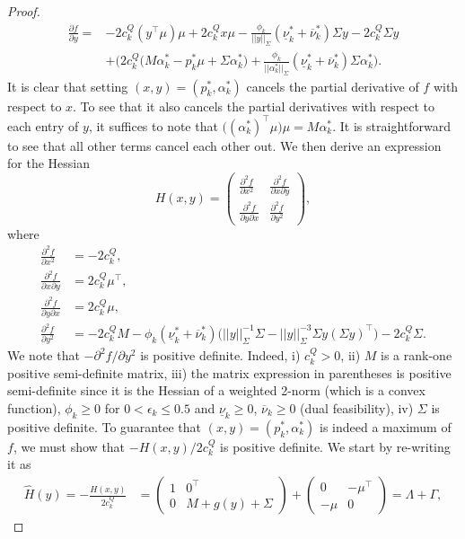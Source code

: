 \documentclass{article}
\begin{document}
\begin{proof}
\begin{align*}
\frac{\partial f}{\partial y} =& - 2c_k^Q (y^\top \mu) \mu + 2 c_k^Q x \mu - \frac{\phi_k}{||y||_\Sigma} (\underline{\nu}_k^* + \overline{\nu}_k^*) \Sigma y - 2c_k^Q \Sigma y\\
&+ \Big(2c_k^Q\big(M \alpha_k^* - p_k^* \mu + \Sigma \alpha_k^*\big) + \frac{\phi_k}{||\alpha_k^*||_\Sigma}(\underline{\nu}_k^* +\overline{\nu}_k^*) \Sigma \alpha_k^*\Big).
\end{align*}
It is clear that setting $(x, y) = (p_k^*, \alpha_k^*)$ cancels the partial derivative of $f$ with respect to $x$. To see that it also cancels the partial derivatives with respect to each entry of $y$, it suffices to note that $\big((\alpha_k^*)^\top \mu\big)\mu = M\alpha_k^*$. It is straightforward to see that all other terms cancel each other out. We then derive an expression for the Hessian
\begin{equation*}
H(x, y) = \begin{pmatrix} \frac{\partial^2 f}{\partial x^2} & \frac{\partial^2 f}{\partial x \partial y} \\ \frac{\partial^2 f}{\partial y \partial x} & \frac{\partial^2 f}{\partial y^2}\end{pmatrix},
\end{equation*}
where
\begin{align*}
\frac{\partial^2 f}{\partial x^2} &= - 2c_k^Q,\\
\frac{\partial^2 f}{\partial x \partial y} &= 2 c_k^Q \mu^\top,\\
\frac{\partial^2 f}{\partial y \partial x} &= 2 c_k^Q \mu,\\
\frac{\partial^2 f}{\partial y^2} &= -2 c_k^Q M - \phi_k(\underline{\nu}_k^* + \overline{\nu}_k^*)\Big(||y||_\Sigma^{-1} \Sigma - ||y||_\Sigma^{-3} \Sigma y(\Sigma y)^\top\Big) - 2c_k^Q \Sigma.
\end{align*}
We note that $-\partial^2 f/\partial y^2$ is positive definite. Indeed, i) $c_k^Q > 0$, ii) $M$ is a rank-one positive semi-definite matrix, iii) the matrix expression in parentheses is positive semi-definite since it is the Hessian of a weighted 2-norm (which is a convex function), $\phi_k \ge 0$ for $0 < \epsilon_k \le 0.5$ and $\underline{\nu}_k \ge 0$, $\overline{\nu}_k \ge 0$ (dual feasibility), iv) $\Sigma$ is positive definite. To guarantee that $(x, y) = (p_k^*, \alpha_k^*)$ is indeed a maximum of $f$, we must show that $-H(x, y)/2c_k^Q$ is positive definite. We start by re-writing it as
\begin{align*}
\hat{H}(y) = -\frac{H(x, y)}{2c_k^Q} &= \begin{pmatrix} 1 & 0^\top \\ 0 & M + g(y) + \Sigma\end{pmatrix} + \begin{pmatrix} 0 & -\mu^\top \\ -\mu & 0\end{pmatrix} = \Lambda + \Gamma,

\end{align*}
\end{proof}
\end{document}
